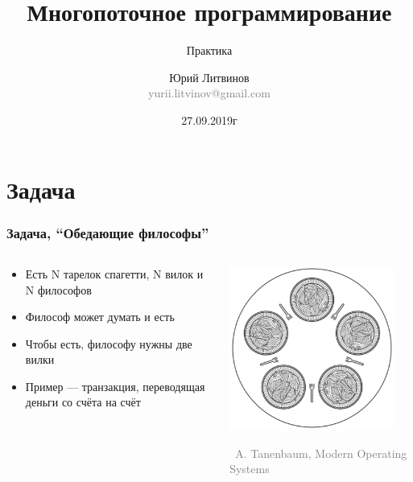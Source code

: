 \documentclass[xetex,mathserif,serif]{beamer}
\title{Многопоточное программирование}
\subtitle{Практика}
\author[Юрий Литвинов]{Юрий Литвинов\\\small{\textcolor{gray}{yurii.litvinov@gmail.com}}}
\date{27.09.2019г}
\newcommand{\attribution}[1] {
\vspace{-2mm}\begin{flushright}\begin{scriptsize}\textcolor{gray}{\textcopyright\, #1}\end{scriptsize}\end{flushright}
}
\begin{document}
	\frame{\titlepage}

	\section{Задача}

	\begin{frame}
		\frametitle{Задача, ``Обедающие философы''}
		\begin{columns}
			\begin{column}{0.5\textwidth}
				\begin{itemize}
					\item Есть N тарелок спагетти, N вилок и N философов
					\item Философ может думать и есть
					\item Чтобы есть, философу нужны две вилки
					\item Пример --- транзакция, переводящая деньги со счёта на счёт
				\end{itemize}
			\end{column}
			\begin{column}{0.5\textwidth}
				\includegraphics[width=0.9\textwidth]{diningPhilosophers.png}
				\attribution{A. Tanenbaum, Modern Operating Systems}
			\end{column}
		\end{columns}
	\end{frame}
\end{document}
